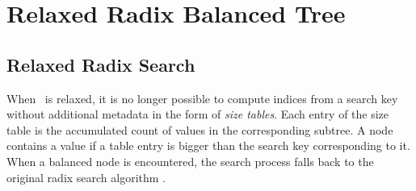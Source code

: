 \chapter{Relaxed Radix Balanced Tree}



\section{Relaxed Radix Search}

When \rbtree\ is relaxed, it is no longer possible to compute indices from a search key without additional metadata in the form of \emph{size tables}. Each entry of the size table is the accumulated count of values in the corresponding subtree. A node contains a value if a table entry is bigger than the search key corresponding to it. When a balanced node is encountered, the search process falls back to the original radix search algorithm .

